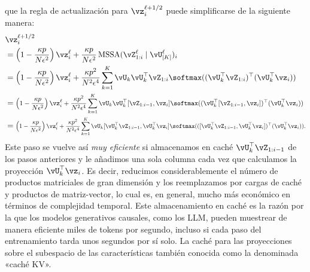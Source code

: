 \documentclass[../../book-main.tex]{subfiles}
\begin{document}
que la regla de actualización para \(\vz_{i}^{\ell + 1/2}\) puede simplificarse de la siguiente manera:
\begin{align}
    &\vz_{i}^{\ell + 1/2} \\
    &= \left(1 - \frac{\kappa p}{N\epsilon^{2}}\right)\vz_{i}^{\ell}
    + \frac{\kappa p}{N
    \epsilon^{2}}\operatorname{MSSA}(\vZ_{1:i}^{\ell} \mid
    \vU_{[K]}^{\ell})_{i} \\
    &= \left(1 - \frac{\kappa p}{N\epsilon^{2}}\right)\vz_{i}^{\ell}
    + \frac{\kappa p^{2}}{N^{2} \epsilon^{4}}\sum_{k =
    1}^{K}\vU_{k}\vU_{k}^{\top}\vZ_{1:i}\softmax((\vU_{k}^{\top}\vZ_{1:i})^{\top}(\vU_{k}^{\top}\vz_{i}))
    \\
    &= \scalebox{0.84}{\(\displaystyle\left(1 - \frac{\kappa
            p}{N\epsilon^{2}}\right)\vz_{i}^{\ell}
            + \frac{\kappa p^{2}}{N^{2} \epsilon^{4}}\sum_{k =
            1}^{K}\vU_{k}\vU_{k}^{\top}[\vZ_{1:i-1},
            \vz_{i}]\softmax((\vU_{k}^{\top}[\vZ_{1:i-1},
    \vz_{i}])^{\top}(\vU_{k}^{\top}\vz_{i}))\)} \\
    &= \scalebox{0.7625}{\(\displaystyle\left(1 - \frac{\kappa
            p}{N\epsilon^{2}}\right)\vz_{i}^{\ell}
            + \frac{\kappa p^{2}}{N^{2} \epsilon^{4}}\sum_{k =
            1}^{K}\vU_{k}[\vU_{k}^{\top}\vZ_{1:i-1},
            \vU_{k}^{\top}\vz_{i}]\softmax(([\vU_{k}^{\top}\vZ_{1:i-1},
    \vU_{k}^{\top}\vz_{i}])^{\top}(\vU_{k}^{\top}\vz_{i})).\)}
\end{align}
Este paso se vuelve así \textit{muy eficiente} si almacenamos en caché
\(\vU_{k}^{\top}\vZ_{1:i-1}\) de los pasos anteriores y le añadimos una sola
columna cada vez que calculamos la proyección
\(\vU_{k}^{\top}\vz_{i}\). Es decir, reducimos considerablemente el número de
productos matriciales de gran dimensión y los reemplazamos por cargas de caché y
productos de matriz-vector, lo cual es, en general, mucho más económico en términos de
complejidad temporal. Este almacenamiento en caché es la razón por la que los modelos generativos causales,
como los LLM, pueden muestrear de manera eficiente miles de tokens por
segundo, incluso si cada paso del entrenamiento tarda unos segundos por sí solo. La
caché para las proyecciones sobre el subespacio de las características también conocida como
la denominada «caché KV».
\end{document}
